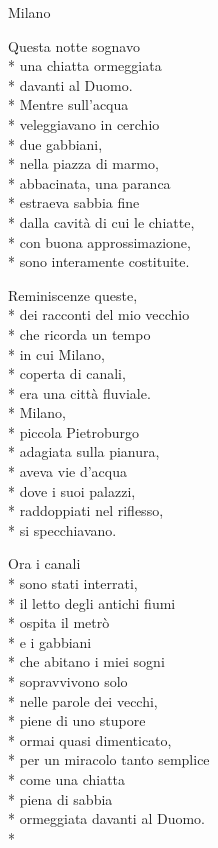 \documentclass[12pt]{book}
\begin{document}
\begin{poem}{Milano}{}

\settowidth{\versewidth}{non meno è ciò che meriti.}


\begin{altverse}
\incipit{}
Questa notte sognavo\\*
una chiatta ormeggiata\\*
davanti al Duomo.\\*
Mentre sull'acqua\\*
veleggiavano in cerchio\\*
due gabbiani,\\*
nella piazza di marmo,\\*
abbacinata, una paranca\\*
estraeva sabbia fine\\*
dalla cavità di cui le chiatte,\\*
con buona approssimazione,\\*
sono interamente costituite.
\end{altverse}

\begin{altverse}
Reminiscenze queste,\\*
dei racconti del mio vecchio\\*
che ricorda un tempo\\*
in cui Milano,\\*
coperta di canali,\\*
era una città fluviale.\\*
Milano,\\*
piccola Pietroburgo\\*
adagiata sulla pianura,\\*
aveva vie d'acqua \\*
dove i suoi palazzi,\\*
raddoppiati nel riflesso,\\*
si specchiavano.
\end{altverse}

\begin{altverse}
Ora i canali\\*
sono stati interrati,\\*
il letto degli antichi fiumi\\*
ospita il metrò\\*
e i gabbiani \\*
che abitano i miei sogni\\*
sopravvivono solo\\*
nelle parole dei vecchi,\\*
piene di uno stupore\\*
ormai quasi dimenticato,\\*
per un miracolo tanto semplice\\*
come una chiatta\\*
piena di sabbia\\*
ormeggiata davanti al Duomo.\\*
\end{altverse}

\end{poem}
\end{document}

